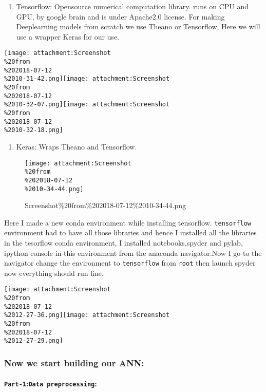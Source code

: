 \documentclass[11pt]{article}
\makeatletter
\def\maxwidth{\ifdim\Gin@nat@width>\linewidth\linewidth
    \else\Gin@nat@width\fi}
\let\Oldincludegraphics\includegraphics
\renewcommand{\includegraphics}[1]{\Oldincludegraphics[width=.8\maxwidth]{#1}}
\providecommand{\tightlist}{%
      \setlength{\itemsep}{0pt}\setlength{\parskip}{0pt}}
\makeatother
\begin{document}
\begin{enumerate}
\def\labelenumi{\arabic{enumi}.}
\setcounter{enumi}{1}
\tightlist
\item
  Tensorflow: Opensource numerical computation library. runs on CPU and
  GPU, by google brain and is under Apache2.0 license. For making
  Deeplearning models from scratch we use Theano or Tensorflow, Here we
  will use a wrapper Keras for our use.
\end{enumerate}

\texttt{[image: attachment:Screenshot\\\%20from\\\%202018-07-12\\\%2010-31-42.png]}\texttt{[image: attachment:Screenshot\\\%20from\\\%202018-07-12\\\%2010-32-07.png]}\texttt{[image: attachment:Screenshot\\\%20from\\\%202018-07-12\\\%2010-32-18.png]}

\begin{enumerate}
\def\labelenumi{\arabic{enumi}.}
\setcounter{enumi}{2}
\tightlist
\item
  Keras: Wraps Theano and Tensorflow.
\end{enumerate}

\begin{figure}
\centering
\texttt{[image: attachment:Screenshot\\\%20from\\\%202018-07-12\\\%2010-34-44.png]}
\caption{Screenshot\%20from\%202018-07-12\%2010-34-44.png}
\end{figure}

Here I made a new conda environment while installing tensorflow.
\texttt{tensorflow} environment had to have all those libraries and
hence I installed all the libraries in the tesorflow conda environment,
I installed notebooks,spyder and pylab, ipython console in this
environment from the anaconda navigator.Now I go to the navigator change
the environment to \texttt{tensorflow} from \texttt{root} then launch
spyder now everything should run fine.

\texttt{[image: attachment:Screenshot\\\%20from\\\%202018-07-12\\\%2012-27-36.png]}\texttt{[image: attachment:Screenshot\\\%20from\\\%202018-07-12\\\%2012-27-29.png]}

\hypertarget{now-we-start-building-our-ann}{%
\subsubsection{Now we start building our
ANN:}\label{now-we-start-building-our-ann}}

\hypertarget{part-1data-preprocessing}{%
\paragraph{\texorpdfstring{\texttt{Part-1}:\texttt{Data\ preprocessing}:}{Part-1:Data preprocessing: }}\label{part-1data-preprocessing}}
\end{document}
